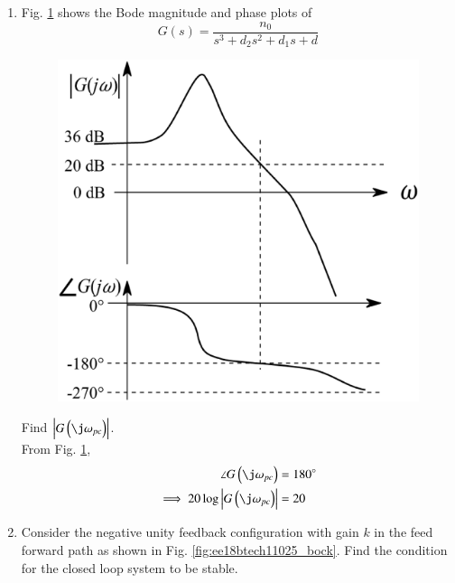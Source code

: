 \begin{enumerate}[label=\thesubsection.\arabic*.,ref=\thesubsection.\theenumi]


\item   Fig. \ref{fig:ee18btech11025} shows  the Bode magnitude and phase plots of 
    \begin{equation}  
            G(s) = \frac{n_0}{s^3 + d_2 s^2 + d_1 s + d}
    \end{equation}
\begin{figure}[ht!]
        \includegraphics[width=\columnwidth]{./figs/ee18btech11025/q42_1.eps}
        \caption{}
        \label{fig:ee18btech11025}
\end{figure}
Find  $\abs{G\brak{\j\omega_{pc}}}$.
\\
\solution From Fig. \ref{fig:ee18btech11025}, 
%
\begin{align}
\angle G\brak{\j\omega_{pc}}  &= 180 \degree
\\
\implies 20\log\abs{ G\brak{\j\omega_{pc}}}  &= 20
\label{ee18btech11025_g_gain}
%
\end{align}
%


\item  Consider the negative unity feedback configuration with gain $k$ in the feed forward path as shown in Fig.     \ref{fig:ee18btech11025_bock}.  Find the condition for the closed loop system to be stable.
%
\begin{figure}[!ht]
	\begin{center}
		

\end{center}
\end{figure}
\end{enumerate}
